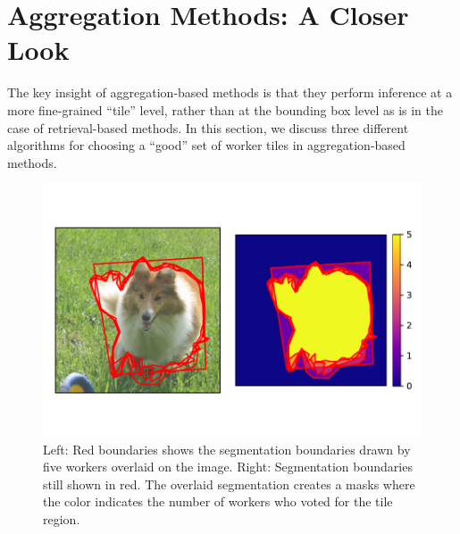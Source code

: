 \section{Aggregation Methods: A Closer Look~\label{sec:agg-detailed}}
The key insight of aggregation-based methods is that they perform inference at a more fine-grained ``tile'' level, rather than at the bounding box level as is in the case of retrieval-based methods. In this section, we discuss three different algorithms for choosing a ``good'' set of worker tiles in aggregation-based methods.
\begin{figure}
\centering
\includegraphics[width=\textwidth]{plots/tile_demo.pdf}
\caption{Left: Red boundaries shows the segmentation boundaries drawn by five workers overlaid on the image. Right: Segmentation boundaries still shown in red. The overlaid segmentation creates a masks where the color indicates the number of workers who voted for the tile region.}
\label{tile_demo}
\end{figure}
